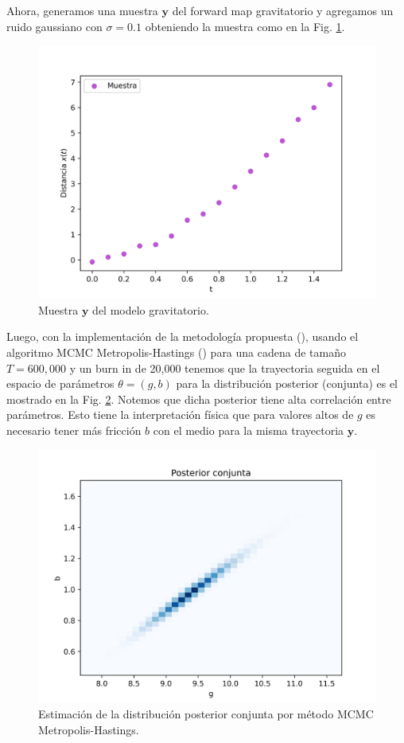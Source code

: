 Ahora, generamos una muestra $\mathbf{y}$ del forward map gravitatorio y agregamos un ruido gaussiano con $\sigma = 0.1$ obteniendo la muestra como en la Fig. \ref{Fig. 3.2.2.02}.

\begin{figure}
    \centering 
    \includegraphics[width = 10 cm ]{img/Exp_Central_gravedad_sigma/Figuras/Generales/Muestra_gravedad_sigma.png} 
    \caption{Muestra $\mathbf{y}$ del modelo gravitatorio.}
    \label{Fig. 3.2.2.02}
\end{figure} 

Luego, con la implementación de la metodología propuesta (\cite{kaipio2006statistical}), usando el algoritmo MCMC Metropolis-Hastings (\cite{christen2010general}) para una cadena de tamaño $T = 600,000$ y un burn in de 20,000 tenemos que la trayectoria seguida en el espacio de parámetros $\theta = (g,b)$ para la distribución posterior (conjunta) es el mostrado en la Fig. \ref{Fig. 3.2.2.03}. Notemos que dicha posterior tiene alta correlación entre parámetros. Esto tiene la interpretación física que para valores altos de $g$ es necesario tener más fricción $b$ con el medio para la misma trayectoria $\mathbf{y}$.

\begin{figure}
    \centering 
    \includegraphics[width = 10 cm ]{img/Exp_Central_gravedad_sigma/Figuras/Generales/Conjunta_gravedad_sigma.png} 
    \caption{Estimación de la distribución posterior conjunta por método MCMC Metropolis-Hastings.}
    \label{Fig. 3.2.2.03}
\end{figure} 

